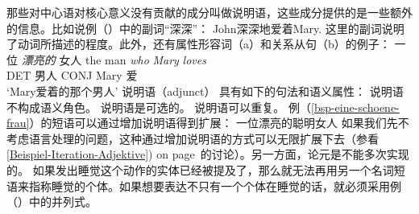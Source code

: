 那些对中心语对核心意义没有贡献的成分叫做说明语，这些成分提供的是一些额外的信息。比如说例（）中的副词“深深”：
\ea
John深深地爱着Mary.
\z
这里的副词说明了动词所描述的程度。此外，还有属性形容词（a）和关系从句（b）的例子：
\eal
\ex\label{bsp-eine-schoene-frau}
一位 {\em 漂亮的\/} 女人
\ex 
\gll the man {\em who\/} {\em Mary\/} {\em loves\/}\\
      DET  男人 CONJ Mary  爱\\
\glt `Mary爱着的那个男人'       
\zl
说明语（adjunct） 具有如下的句法和语义属性：
\eal
\label{adj-kriterien}
\ex 说明语不构成语义角色。
\ex 说明语是可选的。
\ex 说明语可以重复。
\zl
例（\ref{bsp-eine-schoene-frau}）的短语可以通过增加说明语得到扩展：
\ea
一位漂亮的聪明女人
\z
如果我们先不考虑语言处理的问题，这种通过增加说明语的方式可以无限扩展下去（参看\ref{Beispiel-Iteration-Adjektive}) on page~\pageref{Beispiel-Iteration-Adjektive}的讨论）。另一方面，论元是不能多次实现的。
\z
如果发出睡觉这个动作的实体已经被提及了，那么就无法再用另一个名词短语来指称睡觉的个体。如果想要表达不只有一个个体在睡觉的话，就必须采用例（）中的并列式。
